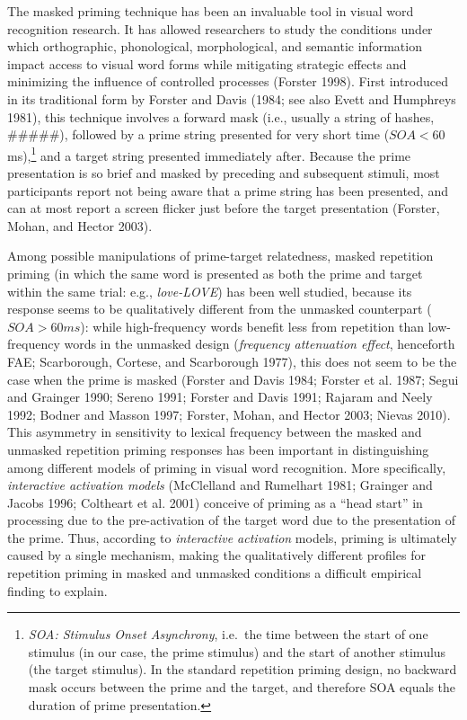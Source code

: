 \documentclass[
]{interact}
\begin{document}
The masked priming technique has been an invaluable tool in visual word
recognition research. It has allowed researchers to study the conditions
under which orthographic, phonological, morphological, and semantic
information impact access to visual word forms while mitigating
strategic effects and minimizing the influence of controlled processes
(Forster 1998). First introduced in its traditional form by Forster and
Davis (1984; see also Evett and Humphreys 1981), this technique involves
a forward mask (i.e., usually a string of hashes, \#\#\#\#\#), followed
by a prime string presented for very short time (\(SOA < 60\)
ms),\footnote{\emph{SOA: Stimulus Onset Asynchrony}, i.e.~the time
  between the start of one stimulus (in our case, the prime stimulus)
  and the start of another stimulus (the target stimulus). In the
  standard repetition priming design, no backward mask occurs between
  the prime and the target, and therefore SOA equals the duration of
  prime presentation.} and a target string presented immediately after.
Because the prime presentation is so brief and masked by preceding and
subsequent stimuli, most participants report not being aware that a
prime string has been presented, and can at most report a screen flicker
just before the target presentation (Forster, Mohan, and Hector 2003).

Among possible manipulations of prime-target relatedness, masked
repetition priming (in which the same word is presented as both the
prime and target within the same trial: e.g., \emph{love-LOVE}) has been
well studied, because its response seems to be qualitatively different
from the unmasked counterpart (\(SOA > 60 ms\)): while high-frequency
words benefit less from repetition than low-frequency words in the
unmasked design (\emph{frequency attenuation effect}, henceforth FAE;
Scarborough, Cortese, and Scarborough 1977), this does not seem to be
the case when the prime is masked (Forster and Davis 1984; Forster et
al. 1987; Segui and Grainger 1990; Sereno 1991; Forster and Davis 1991;
Rajaram and Neely 1992; Bodner and Masson 1997; Forster, Mohan, and
Hector 2003; Nievas 2010). This asymmetry in sensitivity to lexical
frequency between the masked and unmasked repetition priming responses
has been important in distinguishing among different models of priming
in visual word recognition. More specifically, \emph{interactive
activation models} (McClelland and Rumelhart 1981; Grainger and Jacobs
1996; Coltheart et al. 2001) conceive of priming as a ``head start'' in
processing due to the pre-activation of the target word due to the
presentation of the prime. Thus, according to \emph{interactive
activation} models, priming is ultimately caused by a single mechanism,
making the qualitatively different profiles for repetition priming in
masked and unmasked conditions a difficult empirical finding to explain.
\end{document}
